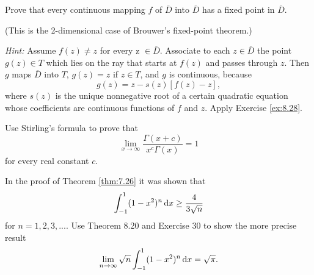\begin{myexercise}
    \label{ex:8.29}
    Prove that every continuous mapping $f$ of $\overline{D}$ into $\overline{D}$ has a fixed point in $\overline{D}$.
    
    (This is the 2-dimensional case of Brouwer's fixed-point theorem.)
    
    \emph{Hint:} Assume $f(z) \neq  z$ for every z $\in \overline{D}$. 
    Associate to each $z \in \overline{D}$ the point
    $g(z) \in T$ which lies on the ray that starts at $f(z)$ and passes through $z$. 
    Then $g$ maps $\overline{D}$ into $T$, $g(z) = z$ if $z \in T$, and $g$ is continuous, because
    \begin{equation*}
        g(z) = z - s(z)[f(z) - z],
    \end{equation*}
    where $s(z)$ is the unique nonnegative root of a certain quadratic equation whose coefficients are continuous functions of $f$ and $z$. 
    Apply Exercise \ref{ex:8.28}.
\end{myexercise}


\begin{myexercise}
    \label{ex:8.30}
    Use Stirling's formula to prove that
    \begin{equation*}
        \lim_{x \to \infty} \frac{\Gamma(x+c)}{x^c \Gamma(x)} = 1
    \end{equation*}
    for every real constant $c$.
\end{myexercise}


\begin{myexercise}
    \label{ex:8.31}
    In the proof of Theorem \ref{thm:7.26} it was shown that
    \begin{equation*}
        \int_{-1}^{1} (1-x^2)^n \d x \geq \frac{4}{3\sqrt{n}}
    \end{equation*}
    for $n = 1, 2, 3, ...$. Use Theorem 8.20 and Exercise 30 to show the more precise result
    \begin{equation*}
        \lim_{n \to \infty} \sqrt{n} \int_{-1}^{1} (1-x^2)^n \d x = \sqrt{\pi} .
    \end{equation*}
\end{myexercise}